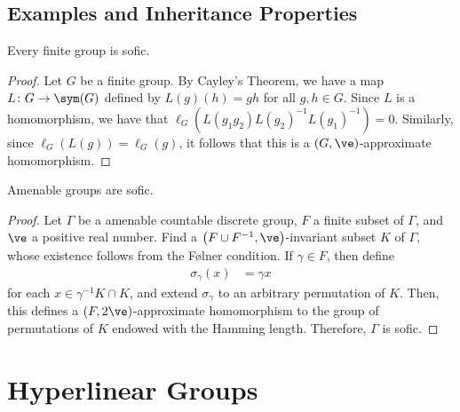 \documentclass[10pt]{mypackage}
\begin{document}
\subsection{Examples and Inheritance Properties}%
\begin{proposition}
  Every finite group is sofic.
\end{proposition}
\begin{proof}
  Let $G$ be a finite group. By Cayley's Theorem, we have a map $L\colon G\rightarrow \sym(G)$ defined by $L(g)(h) = gh$ for all $g,h\in G$. Since $L$ is a homomorphism, we have that $\ell_G\left( L\left( g_1g_2 \right)L\left( g_2 \right)^{-1}L\left( g_1 \right)^{-1} \right) = 0$. Similarly, since $\ell_G\left(L(g)\right) = \ell_G\left( g \right)$, it follows that this is a $\left( G,\ve \right)$-approximate homomorphism.
\end{proof}
\begin{proposition}
  Amenable groups are sofic.
\end{proposition}
\begin{proof}
  Let $\Gamma$ be a amenable countable discrete group, $F$ a finite subset of $\Gamma$, and $\ve$ a positive real number. Find a $\left( F\cup F^{-1},\ve \right)$-invariant subset $K$ of $\Gamma$, whose existence follows from the Følner condition. If $\gamma\in F$, then define
  \begin{align*}
    \sigma_{\gamma}(x) &= \gamma x
  \end{align*}
  for each $x\in \gamma^{-1}K\cap K$, and extend $\sigma_{\gamma}$ to an arbitrary permutation of $K$. Then, this defines a $\left( F,2\ve \right)$-approximate homomorphism to the group of permutations of $K$ endowed with the Hamming length. Therefore, $\Gamma$ is sofic.
\end{proof}
\section{Hyperlinear Groups}%

\nocite{topics_in_groups_and_geometry,cellular_automata_and_groups,capraro2015introductionsofichyperlineargroups}
\printbibliography
\end{document}
